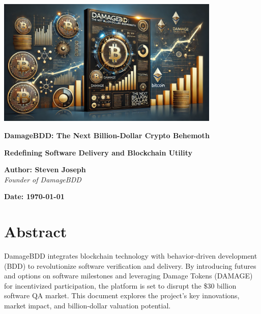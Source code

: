 \documentclass[12pt,a4paper]{article}
\begin{document}
\begin{titlepage}
    \centering
    \includegraphics[width=0.8\textwidth]{compressed/billion_behemoth.png} %
    \vspace{2cm}
    
    {\Huge\bfseries\sffamily DamageBDD: The Next Billion-Dollar Crypto Behemoth}\vspace{1cm}

    {\large\bfseries\sffamily Redefining Software Delivery and Blockchain Utility}\vspace{2cm}

    \textbf{Author: Steven Joseph}\\
    \textit{Founder of DamageBDD}\\
    \vspace{3cm}

    \textbf{Date: \today}\\
    \vfill
\end{titlepage}

\section*{Abstract}
\begin{highlighted}
DamageBDD integrates blockchain technology with behavior-driven development (BDD) to revolutionize software verification and delivery. By introducing futures and options on software milestones and leveraging Damage Tokens (DAMAGE) for incentivized participation, the platform is set to disrupt the \$30 billion software QA market. This document explores the project’s key innovations, market impact, and billion-dollar valuation potential.
\end{highlighted}

\newpage

\tableofcontents
\newpage
\end{document}

